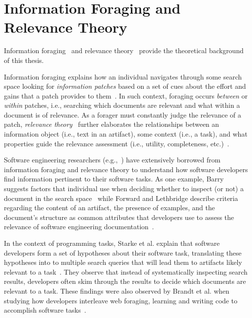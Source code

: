 \section{Information Foraging and Relevance Theory}
\label{cp2:foraging}



Information foraging~\cite{Pirolli1999}
and relevance theory~\cite{clark2013relevance, saracevic1975, Saracevic2007c, Saracevic2007b} 
provide the theoretical background of this thesis.


Information foraging explains how 
an individual navigates through some search space looking for \textit{information patches} based on 
a set of cues about the effort and gains that a patch provides to them~\cite{Pirolli1999}.
In such context, foraging occurs \textit{between} or \textit{within} patches, i.e., 
searching which documents are relevant and what within a document is of relevance.
As a forager must constantly judge
the relevance of a patch, \textit{relevance theory}~\cite{clark2013relevance, saracevic1975} further elaborates the relationships between an information object (i.e., text in an artifact),
some context (i.e., a task), and what properties guide the relevance assessment (i.e., utility, completeness, etc.)~\cite{Saracevic2007c}.



Software engineering researchers (e.g.,~\cite{Piorkowski2015, Piorkowski2016, chi2007, Xia2017}) have extensively borrowed from information foraging and relevance theory
to understand how software developers find  information pertinent to their software tasks.
As one example,
Barry suggests factors that individual use when deciding whether to inspect (or not) a document in the search space~\cite{Barry1994}
while Forward and Lethbridge describe criteria regarding the 
content of an artifact, the presence of examples, and the document's structure as
 common attributes that developers use to assess the relevance of software engineering documentation~\cite{Forward2002}.



In the context of programming tasks, Starke et al. explain that software developers form a set of hypotheses about their software task,
translating these hypotheses into to multiple search queries that will lead them to artifacts likely relevant to a task~\cite{Starke2009}. 
They observe that instead of systematically inspecting search results,
developers often skim through the results to decide which documents are relevant to a task. 
These findings were also observed by Brandt et al. when studying how
developers interleave web foraging, learning and writing code 
to accomplish software tasks~\cite{Brandt2009a}.


